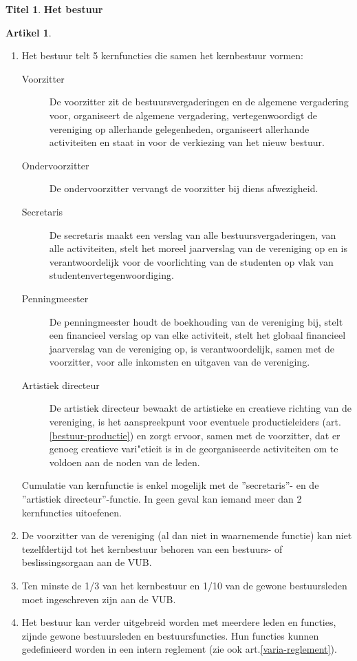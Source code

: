 \documentclass[a4paper,10pt]{article}
\theoremstyle{definition}
\newtheorem{titel}{\newline\Large Titel}
\newtheorem{artikel}{\large Artikel}
\newcommand{\ttext}[1]{\Large \textbf{#1} \normalsize}
\newcommand{\ttextenum}{\mbox{}}
\begin{document}
\begin{titel}\ttext{Het bestuur}

  \begin{artikel}\ttextenum
    \begin{enumerate}
      \item Het bestuur telt 5 kernfuncties die samen het kernbestuur vormen:
      \begin{description}
        \item[Voorzitter]
          De voorzitter zit de bestuursvergaderingen en de algemene vergadering voor, organiseert de algemene vergadering, vertegenwoordigt de vereniging op allerhande gelegenheden, organiseert allerhande activiteiten en staat in voor de verkiezing van het nieuw bestuur.
        \item[Ondervoorzitter]
          De ondervoorzitter vervangt de voorzitter bij diens afwezigheid.
        \item[Secretaris]
          De secretaris maakt een verslag van alle bestuursvergaderingen, van alle activiteiten, stelt het moreel jaarverslag van de vereniging op en is verantwoordelijk voor de voorlichting van de studenten op vlak van studentenvertegenwoordiging.
        \item[Penningmeester]
          De penningmeester houdt de boekhouding van de vereniging bij, stelt een financieel verslag op van elke activiteit, stelt het globaal financieel jaarverslag van de vereniging op, is verantwoordelijk, samen met de voorzitter, voor alle inkomsten en uitgaven van de vereniging.
        \item[Artistiek directeur]
          De artistiek directeur bewaakt de artistieke en creatieve richting van de vereniging, is het aanspreekpunt voor eventuele productieleiders (art.\ref{bestuur-productie}) en zorgt ervoor, samen met de voorzitter, dat er genoeg creatieve vari"etieit is in de georganiseerde activiteiten om te voldoen aan de noden van de leden.
      \end{description}

      Cumulatie van kernfunctie is enkel mogelijk met de ''secretaris''- en de ''artistiek directeur''-functie.
      In geen geval kan iemand meer dan 2 kernfuncties uitoefenen.
      \item De voorzitter van de vereniging (al dan niet in waarnemende functie) kan niet tezelfdertijd tot het kernbestuur behoren van een bestuurs- of beslissingsorgaan aan de VUB.
      \item Ten minste de 1/3 van het kernbestuur en 1/10 van de gewone bestuursleden moet ingeschreven zijn aan de VUB.
      \item Het bestuur kan verder uitgebreid worden met meerdere leden en functies, zijnde gewone bestuursleden en bestuursfuncties.
        Hun functies kunnen gedefinieerd worden in een intern reglement (zie ook art.\ref{varia-reglement}).
    \end{enumerate}
  \end{artikel}


\end{titel}
\end{document}
